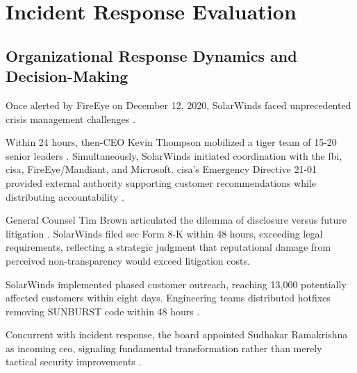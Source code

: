 \section{Incident Response Evaluation}
\label{sec:incident_response}

\subsection{Organizational Response Dynamics and Decision-Making}
Once alerted by FireEye on December 12, 2020, SolarWinds faced unprecedented crisis management challenges \cite{nagle_solarwinds_2023}.

 Within 24 hours, then-CEO Kevin Thompson mobilized a tiger team of 15-20 senior leaders \cite{nagle_solarwinds_2023}. Simultaneously, SolarWinds initiated coordination with the \gls{fbi}, \gls{cisa}, FireEye/Mandiant, and Microsoft. \gls{cisa}'s Emergency Directive 21-01 provided external authority supporting customer recommendations while distributing accountability \cite{us_open_2021, cisa_advanced_2020, office_cybersecurity_2021}.

 General Counsel Tim Brown articulated the dilemma of disclosure versus future litigation \cite{nagle_solarwinds_2023}. SolarWinds filed \gls{sec} Form 8-K within 48 hours, exceeding legal requirements, reflecting a strategic judgment that reputational damage from perceived non-transparency would exceed litigation costs.

 SolarWinds implemented phased customer outreach, reaching 13,000 potentially affected customers within eight days. Engineering teams distributed hotfixes removing SUNBURST code within 48 hours \cite{nagle_solarwinds_2023}.

 Concurrent with incident response, the board appointed Sudhakar Ramakrishna as incoming \gls{ceo}, signaling fundamental transformation rather than merely tactical security improvements \cite{nagle_solarwinds_2023, ramakrishna_new_2021, ramakrishna_our_2021}.

